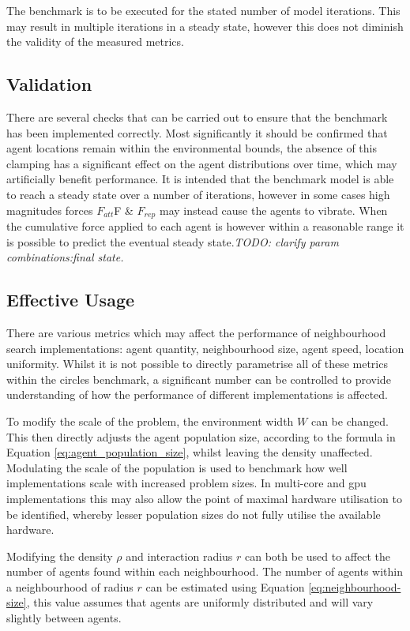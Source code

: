       The benchmark is to be executed for the stated number of model iterations. This may result in multiple iterations in a steady state, however this does not diminish the validity of the measured metrics.
  \subsection{Validation}
    There are several checks that can be carried out to ensure that the benchmark has been implemented correctly. Most significantly it should be confirmed that agent locations remain within the environmental bounds, the absence of this clamping has a significant effect on the agent distributions over time, which may artificially benefit performance. It is intended that the benchmark model is able to reach a steady state over a number of iterations, however in some cases high magnitudes forces $F_{att}$F \& $F_{rep}$ may instead cause the agents to vibrate. When the cumulative force applied to each agent is however within a reasonable range it is possible to predict the eventual steady state.\textit{TODO: clarify param combinations:final state.}
  
  \subsection{Effective Usage\label{sec:effective-usage}}
    There are various metrics which may affect the performance of neighbourhood search implementations: agent quantity, neighbourhood size, agent speed, location uniformity. Whilst it is not possible to directly parametrise all of these metrics within the circles benchmark, a significant number can be controlled to provide understanding of how the performance of different implementations is affected.
    
    To modify the scale of the problem, the environment width $W$ can be changed. This then directly adjusts the agent population size, according to the formula in Equation \ref{eq:agent_population_size}, whilst leaving the density unaffected. Modulating the scale of the population is used to benchmark how well implementations scale with increased problem sizes. In multi-core and \gls{gpu} implementations this may also allow the point of maximal hardware utilisation to be identified, whereby lesser population sizes do not fully utilise the available hardware.
    
    Modifying the density $\rho$ and interaction radius $r$ can both be used to affect the number of agents found within each neighbourhood. The number of agents within a neighbourhood of radius $r$ can be estimated using Equation \ref{eq:neighbourhood-size}, this value assumes that agents are uniformly distributed and will vary slightly between agents.
    
